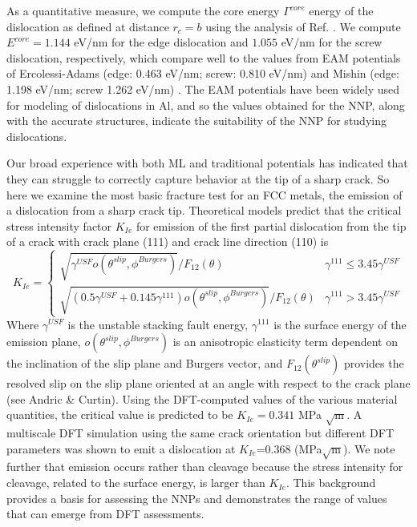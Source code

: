 \documentclass{article}
\begin{document}
As a quantitative measure, we compute the core energy $\Gamma^{core}$ energy of the dislocation as defined at distance $r_c = b$ using the analysis of Ref. \cite{Hu2020AtomisticDynamics}.
We compute $E^{core}=1.144$ eV/nm for the edge dislocation and $1.055$ eV/nm for the screw dislocation, respectively, which compare well to the values from EAM potentials of Ercolessi-Adams\cite{Ercolesi1994InteratomicMethod} (edge: 0.463 eV/nm; screw: 0.810 eV/nm) and Mishin\cite{Mishin1999InteratomicCalculations} (edge: 1.198 eV/nm; screw 1.262 eV/nm) \cite{Hu2020AtomisticDynamics}.  The EAM potentials have been widely used for modeling of dislocations in Al, and so the values obtained for the NNP, along with the accurate structures, indicate the suitability of the NNP for studying dislocations.

Our broad experience with both ML and traditional potentials has indicated that they can struggle to correctly capture behavior at the tip of a sharp crack. 
So here we examine the most basic fracture test for an FCC metals, the emission of a dislocation from a sharp crack tip.
Theoretical models predict that the critical stress intensity factor $K_{Ie}$ for emission of the first partial dislocation from the tip of a crack with crack plane (111) and crack line direction (110) is
\begin{equation}
K_{Ie} =
\begin{cases}
\sqrt{\gamma^{USF}o(\theta^{slip},\phi^{Burgers})}/F_{12}(\theta) & \gamma^{111} \leq 3.45\gamma^{USF}\\
 \sqrt{(0.5\gamma^{USF}+0.145\gamma^{111})o(\theta^{slip},\phi^{Burgers})}/F_{12}(\theta) & \gamma^{111} > 3.45\gamma^{USF}
\end{cases}
\end{equation}
Where $\gamma^{USF}$ is the unstable stacking fault energy, $\gamma^{111}$  is the surface energy of the emission plane, $o(\theta^{slip},\phi^{Burgers})$ is an anisotropic elasticity term dependent on the inclination of the slip plane and Burgers vector, and $F_{12}(\theta^{slip})$ provides the resolved slip on the slip plane oriented at an angle with respect to the crack plane (see Andric \& Curtin\cite{Andric2019AtomisticFracture}).  Using the DFT-computed values of the various material quantities, the critical value is predicted to be $K_{Ie}=0.341$ MPa $\sqrt{\text{m}}$.  A multiscale DFT simulation using the same crack orientation but different DFT parameters\cite{Nair2011} was shown to emit a dislocation at $K_{Ie}$=0.368 (MPa$\sqrt{\text{m}}$).  We note further that emission occurs rather than cleavage because the stress intensity for cleavage, related to the surface energy, is larger than $K_{Ie}$.  This background provides a basis for assessing the NNPs and demonstrates the range of values that can emerge from DFT assessments.
\end{document}
